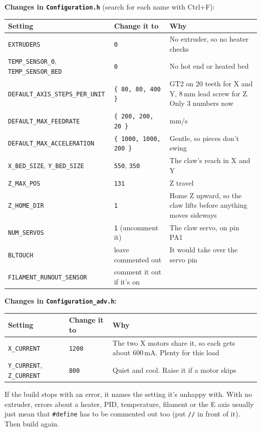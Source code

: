 \documentclass[10pt]{article}
\newcommand{\mm}{\,mm}
\newcommand{\file}[1]{\texttt{#1}}
\begin{document}
\textbf{Changes in \file{Configuration.h}} (search for each name with Ctrl+F):

\begin{tabularx}{\textwidth}{l l L}
\toprule
Setting & Change it to & Why \\
\midrule
\texttt{EXTRUDERS} & \texttt{0} & No extruder, so no heater checks \\
\texttt{TEMP\_SENSOR\_0}, \texttt{TEMP\_SENSOR\_BED} & \texttt{0} & No hot end or heated bed \\
\texttt{DEFAULT\_AXIS\_STEPS\_PER\_UNIT} & \texttt{\{ 80, 80, 400 \}} & GT2 on 20 teeth for X and Y, 8\mm{} lead screw for Z. Only 3 numbers now \\
\texttt{DEFAULT\_MAX\_FEEDRATE} & \texttt{\{ 200, 200, 20 \}} & mm/s \\
\texttt{DEFAULT\_MAX\_ACCELERATION} & \texttt{\{ 1000, 1000, 200 \}} & Gentle, so pieces don't swing \\
\texttt{X\_BED\_SIZE}, \texttt{Y\_BED\_SIZE} & \texttt{550}, \texttt{350} & The claw's reach in X and Y \\
\texttt{Z\_MAX\_POS} & \texttt{131} & Z travel \\
\texttt{Z\_HOME\_DIR} & \texttt{1} & Home Z upward, so the claw lifts before anything moves sideways \\
\texttt{NUM\_SERVOS} & \texttt{1} (uncomment it) & The claw servo, on pin PA1 \\
\texttt{BLTOUCH} & leave commented out & It would take over the servo pin \\
\texttt{FILAMENT\_RUNOUT\_SENSOR} & comment it out if it's on & \\
\bottomrule
\end{tabularx}

\textbf{Changes in \file{Configuration\_adv.h}:}

\begin{tabularx}{\textwidth}{l l L}
\toprule
Setting & Change it to & Why \\
\midrule
\texttt{X\_CURRENT} & \texttt{1200} & The two X motors share it, so each gets about 600\,mA. Plenty for this load \\
\texttt{Y\_CURRENT}, \texttt{Z\_CURRENT} & \texttt{800} & Quiet and cool. Raise it if a motor skips \\
\bottomrule
\end{tabularx}

If the build stops with an error, it names the setting it's unhappy with. With no extruder, errors
about a heater, PID, temperature, filament or the E axis usually just mean that \texttt{\#define} has to
be commented out too (put \texttt{//} in front of it). Then build again.
\end{document}
